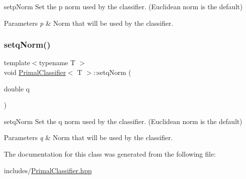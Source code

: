 setp\+Norm Set the p norm used by the classifier. (Euclidean norm is the default) 


\begin{DoxyParams}{Parameters}
{\em p} & Norm that will be used by the classifier. \\
\hline
\end{DoxyParams}
\mbox{\label{class_primal_classifier_a7e6953c01b190e6ef968b75bd578ad7d}} 
\subsubsection{\texorpdfstring{setq\+Norm()}{setqNorm()}}
{\footnotesize\ttfamily template$<$typename T $>$ \\
void \mbox{\hyperlink{class_primal_classifier}{Primal\+Classifier}}$<$ T $>$\+::setq\+Norm (\begin{DoxyParamCaption}\item[{double}]{q }\end{DoxyParamCaption})\hspace{0.3cm}{\ttfamily [inline]}}



setq\+Norm Set the q norm used by the classifier. (Euclidean norm is the default) 


\begin{DoxyParams}{Parameters}
{\em q} & Norm that will be used by the classifier. \\
\hline
\end{DoxyParams}


The documentation for this class was generated from the following file\+:\begin{DoxyCompactItemize}
\item 
includes/\mbox{\hyperlink{_primal_classifier_8hpp}{Primal\+Classifier.\+hpp}}\end{DoxyCompactItemize}
